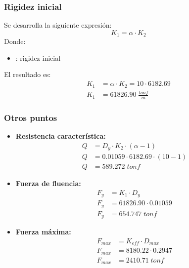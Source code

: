 \subsubsection{Rigidez inicial}
Se desarrolla la siguiente expresión:
\begin{equation}
    K_1 =  \alpha \cdot K_2
    \label{eq2_3}
\end{equation}
Donde:
\begin{itemize}
    \item{}: rigidez inicial
\end{itemize}
El resultado es:
\begin{align*}
    K_1 &= \alpha \cdot K_2 = 10 \cdot 6182.69 \\
    K_1 &= 61826.90 \; \frac{tonf}{m}
\end{align*}

\subsubsection{Otros puntos}
\begin{itemize}
    \item \textbf{Resistencia característica:}
    \begin{align}
        Q &= D_y \cdot K_2 \cdot (\alpha - 1) \label{eq2_4} \\
        Q &= 0.01059 \cdot 6182.69 \cdot (10 - 1) \nonumber \\
        Q &= 589.272 \; tonf \nonumber
    \end{align}
    
    \item \textbf{Fuerza de fluencia:}
    \begin{align}
        F_y &= K_1 \cdot D_y \label{eq2_5} \\
        F_y &= 61826.90 \cdot 0.01059 \nonumber \\
        F_y &=  654.747 \; tonf \nonumber
    \end{align}

    \item \textbf{Fuerza máxima:}
    \begin{align}
        F_{max} &= K_{eff} \cdot D_{max} \label{eq2_6} \\
        F_{max} &= 8180.22 \cdot 0.2947 \nonumber \\
        F_{max} &= 2410.71 \; tonf \nonumber
    \end{align}
\end{itemize}

